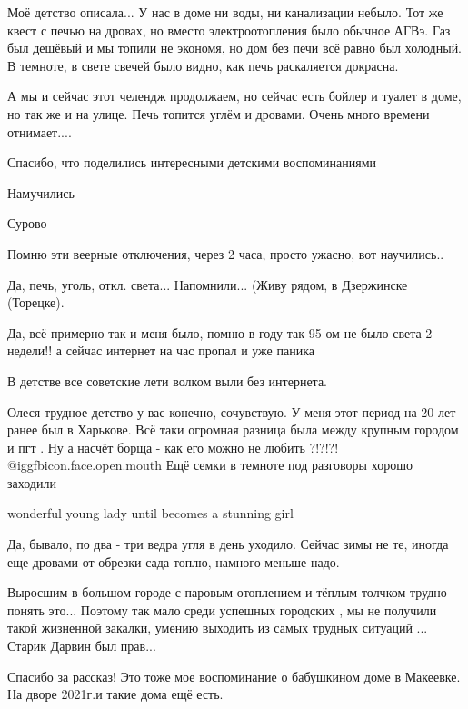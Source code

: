 \begin{itemize}

Моё детство описала... У нас в доме ни воды, ни канализации небыло. Тот же
квест с печью на дровах, но вместо электроотопления было обычное АГВэ. Газ был
дешёвый и мы топили не экономя, но дом без печи всё равно был холодный. В
темноте, в свете свечей было видно, как печь раскаляется докрасна.


А мы и сейчас этот челендж продолжаем, но сейчас есть бойлер и туалет в доме,
но так же и на улице. Печь топится углём и дровами. Очень много времени
отнимает....

Спасибо, что поделились интересными детскими воспоминаниями

Намучились

Сурово

Помню эти веерные отключения, через 2 часа, просто ужасно, вот научились..

Да, печь, уголь, откл. света... Напомнили... (Живу рядом, в Дзержинске (Торецке).

Да, всё примерно так и меня было, помню в году так 95-ом не было света 2 недели!! а сейчас интернет на час пропал и уже паника

В детстве все советские лети волком выли без интернета.


Олеся трудное детство у вас конечно, сочувствую. У меня этот период на 20 лет
ранее был в Харькове. Всё таки огромная разница была между крупным городом и
пгт . Ну а насчёт борща - как его можно не любить ?!?!?!  @igg{fbicon.face.open.mouth} 
Ещё семки в темноте под разговоры хорошо заходили

wonderful young lady until becomes a stunning girl

Да, бывало, по два - три ведра угля в день уходило. Сейчас зимы не те, иногда еще дровами от обрезки сада топлю, намного меньше надо.

Выросшим в большом городе с паровым отоплением и тёплым толчком трудно понять это... Поэтому так мало среди успешных городских , мы не получили такой жизненной закалки, умению выходить из самых трудных ситуаций ... Старик Дарвин был прав...

Спасибо за рассказ!
Это тоже мое воспоминание о бабушкином доме в Макеевке.
На дворе 2021г.и такие дома ещё есть.


\end{itemize}
